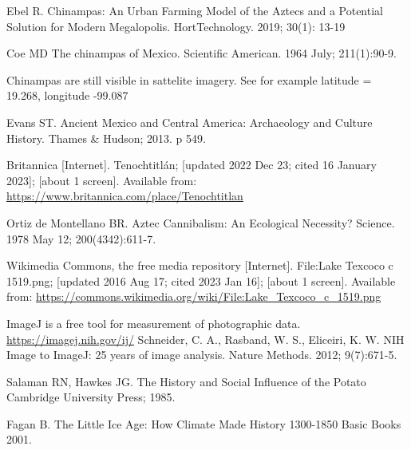 \documentclass[12pt]{iopart}
\begin{document}
\begin{thebibliography}{99}
Ebel R.
Chinampas: An Urban Farming Model of the Aztecs and a Potential Solution for Modern Megalopolis.
HortTechnology.
2019; 
30(1): 13-19

Coe MD
The chinampas of Mexico.
Scientific American.
1964 July; 211(1):90-9.

Chinampas are still visible in sattelite imagery.  See for example latitude = 19.268, longitude -99.087

Evans ST.
Ancient Mexico and Central America: Archaeology and Culture History. 
Thames \& Hudson; 
2013. 
p 549.

Britannica [Internet].
Tenochtitlán;
[updated 2022 Dec 23; cited 16 January 2023]; [about 1 screen].
Available from: \url{https://www.britannica.com/place/Tenochtitlan}

Ortiz de Montellano BR.
Aztec Cannibalism: An Ecological Necessity?
Science.
1978 May 12; 
200(4342):611-7.

Wikimedia Commons, the free media repository [Internet].
File:Lake Texcoco c 1519.png;
[updated 2016 Aug 17; cited 2023 Jan 16]; [about 1 screen].
Available from: \url{https://commons.wikimedia.org/wiki/File:Lake\_Texcoco\_c\_1519.png}


ImageJ is a free tool for measurement of photographic data.  
\url{https://imagej.nih.gov/ij/}
Schneider, C. A., Rasband, W. S., Eliceiri, K. W. 
NIH Image to ImageJ: 25 years of image analysis. 
Nature Methods.
2012; 
9(7):671-5. 

Salaman RN, Hawkes JG.
The History and Social Influence of the Potato
Cambridge University Press; 
1985.

Fagan B.
The Little Ice Age: How Climate Made History 1300-1850
Basic Books 
2001.


\end{thebibliography}
\end{document}
